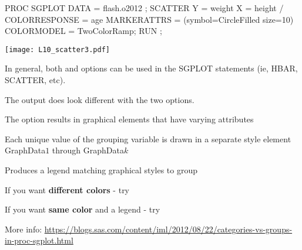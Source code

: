 \begin{frame}[fragile]
\footnotesize
\begin{code}{.0}
PROC SGPLOT DATA = flash.o2012 ;
   SCATTER Y = weight X = height /
     COLORRESPONSE = age
     MARKERATTRS = (symbol=CircleFilled size=10)
     COLORMODEL = TwoColorRamp;
RUN ;
\end{code}
\emp
\vspace{1ex}
\texttt{[image: L10\_scatter3.pdf]}
\emp
\end{frame}



\begin{frame}[fragile]
\bi
\item In general, both  and  options can be used in the SGPLOT statements (ie, HBAR, SCATTER, etc).
\item The output does look different with the two options.
\item The  option results in graphical elements that have varying attributes
\bi
\item Each unique value of the grouping variable is drawn in a separate style element GraphData$1$ through GraphData$k$
\item Produces a legend matching graphical styles to group
\ei
\item If you want \textbf{different colors} - try 
\item If you want \textbf{same color} and a legend - try 
\item More info: \url{https://blogs.sas.com/content/iml/2012/08/22/categories-vs-groups-in-proc-sgplot.html}
\ei

\end{frame}


 